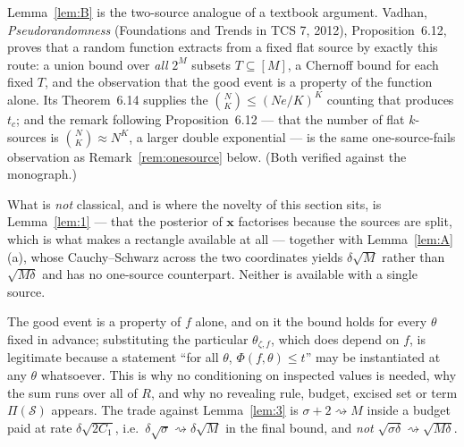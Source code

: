 \documentclass{aicr-solution}
\newcommand{\vx}{\mathbf{x}}
\begin{document}
\begin{remark}\label{rem:vadhan}
Lemma~\ref{lem:B} is the two-source analogue of a textbook argument. Vadhan,
\emph{Pseudorandomness} (Foundations and Trends in TCS 7, 2012), Proposition~6.12, proves that a
random function extracts from a fixed flat source by exactly this route: a union bound over
\emph{all} $2^{M}$ subsets $T \subseteq [M]$, a Chernoff bound for each fixed $T$, and the
observation that the good event is a property of the function alone. Its Theorem~6.14 supplies the
$\binom{N}{K} \le (Ne/K)^{K}$ counting that produces $t_c$; and the remark following
Proposition~6.12 --- that the number of flat $k$-sources is $\binom{N}{K} \approx N^{K}$, a larger
double exponential --- is the same one-source-fails observation as
Remark~\ref{rem:onesource} below. (Both verified against the monograph.)

What is \emph{not} classical, and is where the novelty of this section sits, is
Lemma~\ref{lem:1} --- that the posterior of $\vx$ factorises because the sources are split, which
is what makes a rectangle available at all --- together with Lemma~\ref{lem:A}(a), whose
Cauchy--Schwarz across the two coordinates yields $\delta\sqrt{M}$ rather than $\sqrt{M\delta}$ and
has no one-source counterpart. Neither is available with a single source.
\end{remark}

\begin{remark}\label{rem:qorder-B}
The good event is a property of $f$ alone, and on it the bound holds for every
$\theta$ fixed in advance; substituting the particular $\theta_{\zeta,f}$, which
does depend on $f$, is legitimate because a statement ``for all $\theta$,
$\Phi(f,\theta) \le t$'' may be instantiated at any $\theta$ whatsoever. This is
why no conditioning on inspected values is needed, why the sum runs over all of
$R$, and why no revealing rule, budget, excised set or term
$\Pi(\mathcal{S})$ appears. The trade against Lemma~\ref{lem:3} is
$\sigma+2 \rightsquigarrow M$ inside a budget paid at rate $\delta\sqrt{2C_1}$,
i.e.\ $\delta\sqrt{\sigma} \rightsquigarrow \delta\sqrt{M}$ in the final bound,
and \emph{not} $\sqrt{\sigma\delta} \rightsquigarrow \sqrt{M\delta}$.
\end{remark}
\end{document}
